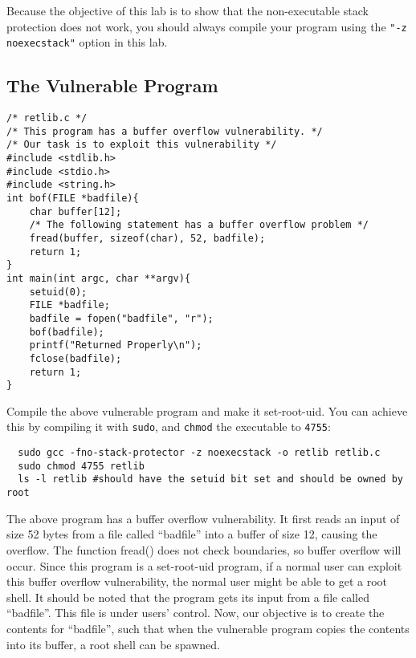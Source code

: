 Because the objective of this lab is to show that the non-executable stack
protection does not work, you should always compile your program using the 
{\tt "-z noexecstack"} option in this lab.

\subsection{The Vulnerable Program}
\begin{verbatim}
/* retlib.c */
/* This program has a buffer overflow vulnerability. */
/* Our task is to exploit this vulnerability */
#include <stdlib.h>
#include <stdio.h>
#include <string.h>
int bof(FILE *badfile){
    char buffer[12];
    /* The following statement has a buffer overflow problem */
    fread(buffer, sizeof(char), 52, badfile);
    return 1;
}
int main(int argc, char **argv){
    setuid(0);
    FILE *badfile;
    badfile = fopen("badfile", "r");
    bof(badfile);
    printf("Returned Properly\n");
    fclose(badfile);
    return 1;
}
\end{verbatim}

\noindent
Compile the above vulnerable program and make it set-root-uid. You
can achieve this by compiling it with {\tt sudo}, and 
{\tt chmod} the executable to {\tt 4755}:

\begin{verbatim}
  sudo gcc -fno-stack-protector -z noexecstack -o retlib retlib.c
  sudo chmod 4755 retlib
  ls -l retlib #should have the setuid bit set and should be owned by root
\end{verbatim}

The above program has a buffer overflow vulnerability. It first reads
an input of size 52 bytes from a file called ``badfile'' into a buffer
of size 12, causing the overflow. The function fread() does not check
boundaries, so buffer overflow will occur.  Since this program is a
set-root-uid program, if a normal user can exploit this buffer
overflow vulnerability, the normal user might be able to get a root
shell.  It should be noted that the program gets its input from a file
called ``badfile''. This file is under users' control. Now, our
objective is to create the contents for ``badfile'', such that when
the vulnerable program copies the contents into its buffer, a root
shell can be spawned.

